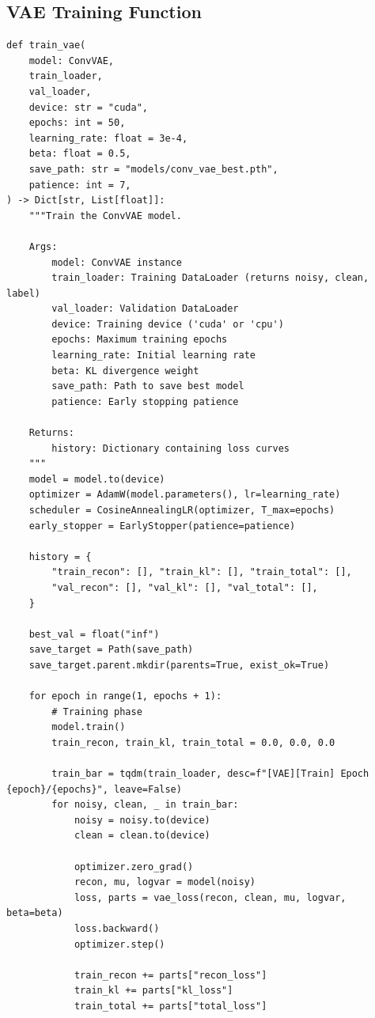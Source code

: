 \documentclass[11pt,a4paper]{article}
\begin{document}
\subsection{VAE Training Function}

\begin{lstlisting}[caption={src/train\_vae.py - Training Function}, label={lst:train-vae}]
def train_vae(
    model: ConvVAE,
    train_loader,
    val_loader,
    device: str = "cuda",
    epochs: int = 50,
    learning_rate: float = 3e-4,
    beta: float = 0.5,
    save_path: str = "models/conv_vae_best.pth",
    patience: int = 7,
) -> Dict[str, List[float]]:
    """Train the ConvVAE model.

    Args:
        model: ConvVAE instance
        train_loader: Training DataLoader (returns noisy, clean, label)
        val_loader: Validation DataLoader
        device: Training device ('cuda' or 'cpu')
        epochs: Maximum training epochs
        learning_rate: Initial learning rate
        beta: KL divergence weight
        save_path: Path to save best model
        patience: Early stopping patience

    Returns:
        history: Dictionary containing loss curves
    """
    model = model.to(device)
    optimizer = AdamW(model.parameters(), lr=learning_rate)
    scheduler = CosineAnnealingLR(optimizer, T_max=epochs)
    early_stopper = EarlyStopper(patience=patience)

    history = {
        "train_recon": [], "train_kl": [], "train_total": [],
        "val_recon": [], "val_kl": [], "val_total": [],
    }

    best_val = float("inf")
    save_target = Path(save_path)
    save_target.parent.mkdir(parents=True, exist_ok=True)

    for epoch in range(1, epochs + 1):
        # Training phase
        model.train()
        train_recon, train_kl, train_total = 0.0, 0.0, 0.0

        train_bar = tqdm(train_loader, desc=f"[VAE][Train] Epoch {epoch}/{epochs}", leave=False)
        for noisy, clean, _ in train_bar:
            noisy = noisy.to(device)
            clean = clean.to(device)

            optimizer.zero_grad()
            recon, mu, logvar = model(noisy)
            loss, parts = vae_loss(recon, clean, mu, logvar, beta=beta)
            loss.backward()
            optimizer.step()

            train_recon += parts["recon_loss"]
            train_kl += parts["kl_loss"]
            train_total += parts["total_loss"]


\end{lstlisting}
\end{document}
